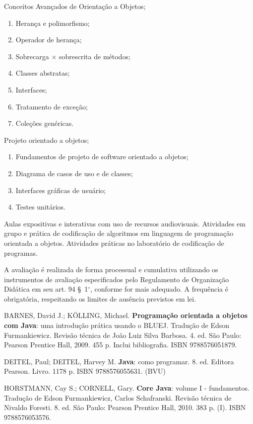 \begin{pud}
\begin{description}[itemsep=0em]
         \item[UNIDADE III:] Conceitos Avançados de Orientação a Objetos;
	         \begin{enumerate}[itemsep=0em, topsep=0em]
				\item Herança e polimorfismo;
				\item Operador de herança;
				\item Sobrecarga $\times$ sobrescrita de métodos;
				\item Classes abstratas;
				\item Interfaces;
				\item Tratamento de exceção;
				\item Coleções genéricas.      
            \end{enumerate}
            
         \item[UNIDADE IV:]  Projeto orientado a objetos;
	         \begin{enumerate}[itemsep=0em, topsep=0em]
				\item Fundamentos de projeto de software orientado a objetos;
				\item Diagrama de casos de uso e de classes;
				\item Interfaces gráficas de usuário;
				\item Testes unitários.
            \end{enumerate}
	\end{description}	
	
	\metodologia
	Aulas expositivas e interativas com uso de recursos audiovisuais.  Atividades em grupo e prática de codificação de algoritmos em linguagem de programação orientada a objetos. Atividades práticas no laboratório de codificação de programas.
	
	\avaliacao
	A avaliação é realizada de forma processual e cumulativa utilizando os instrumentos de avaliação especificados pelo Regulamento de Organização Didática em seu art. 94 \S~1$^\circ$, conforme for mais adequado. A frequência é obrigatória, respeitando os limites de ausência previstos em lei.
	
	

	\begin{bibbasica}
		\item BARNES, David J.; KÖLLING, Michael. \textbf{Programação orientada a objetos com Java}: uma introdução prática usando o BLUEJ. Tradução de Edson Furmankiewicz. Revisão técnica de João Luiz Silva Barbosa. 4. ed. São Paulo: Pearson Prentice Hall, 2009. 455 p. Inclui bibliografia. ISBN 9788576051879. 
		\item DEITEL, Paul; DEITEL, Harvey M. \textbf{Java}: como programar. 8. ed. Editora Pearson. Livro. 1178 p. ISBN 9788576055631. (BVU)
		\item HORSTMANN, Cay S.; CORNELL, Gary. \textbf{Core Java}: volume I - fundamentos. Tradução de Edson Furmankiewicz, Carlos Schafranski. Revisão técnica de Nivaldo Foresti. 8. ed. São Paulo: Pearson Prentice Hall, 2010. 383 p. (I). ISBN 9788576053576.
		

\end{bibbasica}
\end{pud}
